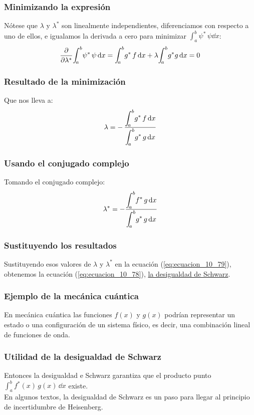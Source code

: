 \documentclass[12pt]{beamer}
\begin{document}
\begin{frame}
\frametitle{Minimizando la expresión}
Nótese que $\lambda$ y $\lambda^{*}$ son linealmente independientes, \pause diferenciamos con respecto a uno de ellos, \pause e igualamos la derivada a cero para minimizar $\displaystyle \int_{a}^{b} \psi^{*} \, \psi \dd{x}$:
\pause
\begin{align*}
\pdv{\lambda^{*}} \scaleint{5ex}_{\bs a}^{b} \psi^{*} \, \psi \dd{x} = \scaleint{5ex}_{\bs a}^{b} g^{*} \, f \dd{x}  + \lambda \scaleint{5ex}_{\bs a}^{b} g^{*} g \dd{x} = 0
\end{align*}
\end{frame}
\begin{frame}
\frametitle{Resultado de la minimización}
Que nos lleva a:
\pause
\begin{align}
\lambda = - \, \dfrac{\displaystyle \scaleint{5ex}_{\bs a}^{b} g^{*} \, f \dd{x}}{\displaystyle \scaleint{5ex}_{\bs a}^{b} g^{*} \, g \dd{x}}
\label{eq:ecuacion_10_80a}
\end{align}
\end{frame}
\begin{frame}
\frametitle{Usando el conjugado complejo}
Tomando el conjugado complejo:
\pause
\begin{align}
\lambda^{*} = - \dfrac{\displaystyle \scaleint{5ex}_{\bs a}^{b} f^{*} \, g \dd{x}}{\displaystyle \scaleint{5ex}_{\bs a}^{b} g^{*} \, g \dd{x}}
\label{eq:ecuacion_80b}
\end{align}
\end{frame}
\begin{frame}
\frametitle{Sustituyendo los resultados}
Sustituyendo esos valores de $\lambda$ y $\lambda^{*}$ en la ecuación (\ref{eq:ecuacion_10_79}), \pause obtenemos la ecuación (\ref{eq:ecuacion_10_78}), \underline{la desigualdad de Schwarz}.
\end{frame}
\begin{frame}
\frametitle{Ejemplo de la mecánica cuántica}
En mecánica cuántica las funciones $f (x)$ y $g (x)$ podrían representar un estado o una configuración de un sistema físico, es decir, una combinación lineal de funciones de onda.
\end{frame}
\begin{frame}
\frametitle{Utilidad de la desigualdad de Schwarz}
Entonces la desigualdad e Schwarz garantiza que el producto punto $\displaystyle \int_{a}^{b} f^{*} (x) \, g(x) \, \dd{x}$ existe.
\\
\bigskip
\pause
En algunos textos, la desigualdad de Schwarz es un paso para llegar al principio de incertidumbre de Heisenberg.
\end{frame}
\end{document}
